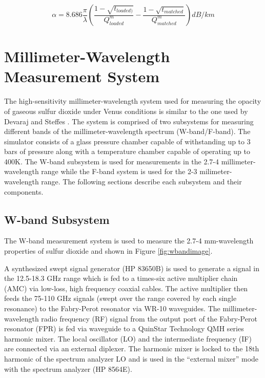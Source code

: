 \begin{equation} \label{eq:alphamatch}
\alpha = 8.686 \frac{\pi}{\lambda}\left(\frac{1 - \sqrt{t_{loaded)}}}{Q^m_{loaded}} - \frac{1-\sqrt{t_{matched}}}{Q_{matched}^m} \right) dB/km
\end{equation}

\section{Millimeter-Wavelength Measurement System}

The high-sensitivity millimeter-wavelength system used for measuring the opacity of gaseous sulfur dioxide under Venus conditions is similar to the one used by Devaraj and Steffes \cite{Devaraj-2011} \cite{Devaraj-thesis}. The system is comprised of two subsystems for measuring different bands of the millimeter-wavelength spectrum (W-band/F-band). The simulator consists of a glass pressure chamber capable of withstanding up to 3 bars of pressure along with a temperature chamber capable of operating up to 400K. The W-band subsystem is used for measurements in the 2.7-4 millimeter-wavelength range while the F-band system is used for the 2-3 milimeter-wavelength range. The following sections describe each subsystem and their components. 

\subsection{W-band Subsystem}

The W-band measurement system is used to measure the 2.7-4 mm-wavelength properties of sulfur dioxide and shown in Figure \ref{fig:wbandimage}.

A synthesized swept signal generator (HP 83650B) is used to generate a signal in the 12.5-18.3 GHz range which is fed to a times-six active multiplier chain (AMC) via low-loss, high frequency coaxial cables. The active multiplier then feeds the 75-110 GHz signals (swept over the range covered by each single resonance) to the Fabry-Perot resonator via WR-10 waveguides. The millimeter-wavelength radio frequency (RF) signal from the output port of the Fabry-Perot resonator (FPR) is fed via waveguide to a QuinStar Technology QMH series harmonic mixer. The local oscillator (LO) and the intermediate frequency (IF) are connected via an external diplexer. The harmonic mixer is locked to the 18th harmonic of the spectrum analyzer LO and is used in the ``external mixer'' mode with the spectrum analyzer (HP 8564E). 

